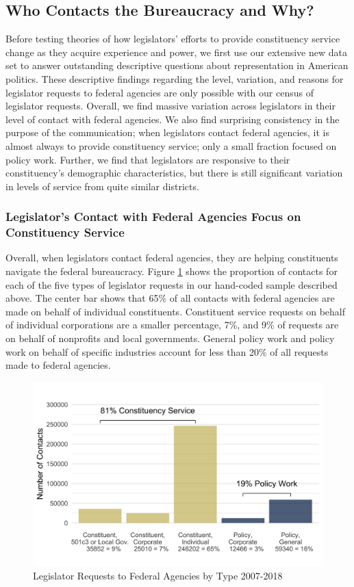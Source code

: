 \documentclass[12pt]{article}
\begin{document}
{\subsection{Who Contacts the Bureaucracy and Why?} \label{s:descriptive} 
Before testing theories of how legislators' efforts to provide constituency service change as they acquire experience and power, we first use our extensive new data set to answer outstanding descriptive questions about representation in American politics. These descriptive findings regarding the level, variation, and reasons for legislator requests to federal agencies are only possible with our census of legislator requests. Overall, we find massive variation across legislators in their level of contact with federal agencies. We also find surprising consistency in the purpose of the communication; when legislators contact federal agencies, it is almost always to provide constituency service; only a small fraction focused on policy work. Further, we find that legislators are responsive to their constituency's demographic characteristics, but there is still significant variation in levels of service from quite similar districts.  

\subsubsection{Legislator's Contact with Federal Agencies Focus on Constituency Service}
Overall, when legislators contact federal agencies, they are helping constituents navigate the federal bureaucracy. Figure \ref{f:type2} shows the proportion of contacts for each of the five types of legislator requests in our hand-coded sample described above. The center bar shows that 65\% of all contacts with federal agencies are made on behalf of individual constituents. Constituent service requests on behalf of individual corporations are a smaller percentage, 7\%, and 9\% of requests are on behalf of nonprofits and local governments. General policy work and policy work on behalf of specific industries account for less than 20\% of all requests made to federal agencies.  


\begin{figure}[hbt!]
\centering
\caption{Legislator Requests to Federal Agencies by Type 2007-2018} \label{f:type2}
\includegraphics[width = .8\textwidth]{figs/data_by_type-tall-1}
\end{figure}



}
\end{document}
